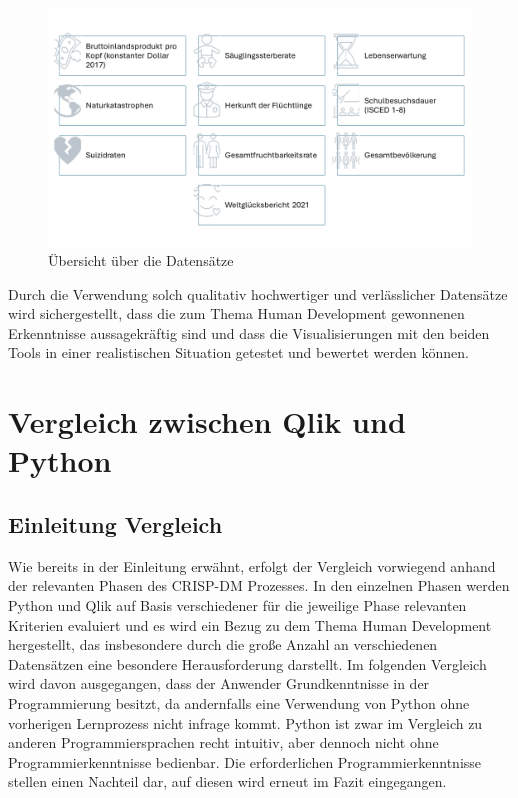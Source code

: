\documentclass[12pt]{article}
\begin{document}
	\begin{figure}[h]
		\centering
		\includegraphics[width=1.0\textwidth]{Daten}
		\caption{Übersicht über die Datensätze}
	\end{figure}
	
	Durch die Verwendung solch qualitativ hochwertiger und verlässlicher Datensätze wird sichergestellt, dass die zum Thema Human Development gewonnenen Erkenntnisse aussagekräftig sind und dass die Visualisierungen mit den beiden Tools in einer realistischen Situation getestet und bewertet werden können.
	\section{Vergleich zwischen Qlik und Python}
	
	\subsection{Einleitung Vergleich}
	Wie bereits in der Einleitung erwähnt, erfolgt der Vergleich vorwiegend anhand der relevanten Phasen des CRISP-DM Prozesses. In den einzelnen Phasen werden Python und Qlik auf Basis verschiedener für die jeweilige Phase relevanten Kriterien evaluiert und es wird ein Bezug zu dem Thema Human Development hergestellt, das insbesondere durch die große Anzahl an verschiedenen Datensätzen eine besondere Herausforderung darstellt. Im folgenden Vergleich wird davon ausgegangen, dass der Anwender Grundkenntnisse in der Programmierung besitzt, da andernfalls eine Verwendung von Python ohne vorherigen Lernprozess nicht infrage kommt. Python ist zwar im Vergleich zu anderen Programmiersprachen recht intuitiv, aber dennoch nicht ohne Programmierkenntnisse bedienbar. Die erforderlichen Programmierkenntnisse stellen einen Nachteil dar, auf diesen wird erneut im Fazit eingegangen.
	
\end{document}
